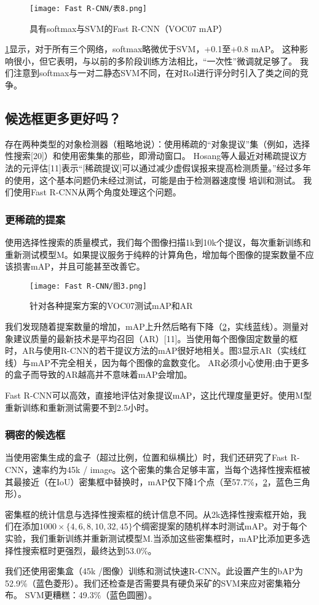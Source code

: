\begin{figure}[h]
    \centering
    \texttt{[image: Fast R-CNN/表8.png]}
    \caption{具有softmax与SVM的Fast R-CNN（VOC07 mAP）}
    \label{表8}
\end{figure}

\ref{表8}显示，对于所有三个网络，softmax略微优于SVM，+0.1至+0.8 mAP。 这种影响很小，但它表明，与以前的多阶段训练方法相比，“一次性”微调就足够了。 我们注意到softmax与一对二静态SVM不同，在对RoI进行评分时引入了类之间的竞争。

\subsection{候选框更多更好吗？}
\par 存在两种类型的对象检测器（粗略地说）：使用稀疏的“对象提议”集（例如，选择性搜索[20]）和使用密集集的那些，即滑动窗口。 Hosang等人最近对稀疏提议方法的元评估[11]表示“[稀疏提议]可以通过减少虚假误报来提高检测质量。”经过多年的使用，这个基本问题仍未经过测试，可能是由于检测器速度慢 培训和测试。 我们使用Fast R-CNN从两个角度处理这个问题。
\subsubsection{更稀疏的提案}
\par 使用选择性搜索的质量模式，我们每个图像扫描1k到10k个提议，每次重新训练和重新测试模型M。如果提议服务于纯粹的计算角色，增加每个图像的提案数量不应该损害mAP，并且可能甚至改善它。

\begin{figure}[h]
    \centering
    \texttt{[image: Fast R-CNN/图3.png]}
    \caption{针对各种提案方案的VOC07测试mAP和AR}
    \label{图3}
\end{figure}

\par 我们发现随着提案数量的增加，mAP上升然后略有下降（\ref{图3}，实线蓝线）。测量对象建议质量的最新技术是平均召回（AR）[11]。当使用每个图像固定数量的框时，AR与使用R-CNN的若干提议方法的mAP很好地相关。图3显示AR（实线红线）与mAP不完全相关，因为每个图像的盒数变化。 AR必须小心使用;由于更多的盒子而导致的AR越高并不意味着mAP会增加。
\par Fast R-CNN可以高效，直接地评估对象提议mAP，这比代理度量更好。使用M型重新训练和重新测试需要不到2.5小时。
\subsubsection{稠密的候选框}
\par 当使用密集生成的盒子（超过比例，位置和纵横比）时，我们还研究了Fast R-CNN，速率约为45k / image。这个密集的集合足够丰富，当每个选择性搜索框被其最接近（在IoU）密集框中替换时，mAP仅下降1个点（至57.7\%，\ref{图3}，蓝色三角形）。
\par 密集框的统计信息与选择性搜索框的统计信息不同。从2k选择性搜索框开始，我们在添加$1000\times\{4,6,8,10,32,45\}$个绸密提案的随机样本时测试mAP。对于每个实验，我们重新训练并重新测试模型M.当添加这些密集框时，mAP比添加更多选择性搜索框时更强烈，最终达到53.0\%。
\par 我们还使用密集盒（45k /图像）训练和测试快速R-CNN。此设置产生的bAP为52.9\%（蓝色菱形）。我们还检查是否需要具有硬负采矿的SVM来应对密集箱分布。 SVM更糟糕：49.3\%（蓝色圆圈）。
